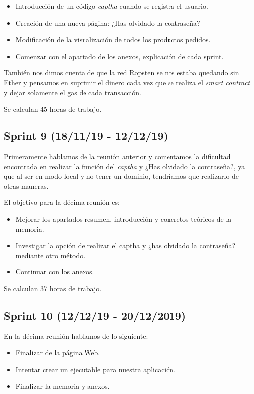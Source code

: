 \begin{itemize}
	\item Introducción de un código \textit{captha} cuando se registra el usuario.
	\item Creación de una nueva página: ¿Has olvidado la contraseña?
	\item Modificación de la visualización de todos los productos pedidos.
	\item Comenzar con el apartado de los anexos, explicación de cada sprint.
\end{itemize}

También nos dimos cuenta de que la red Ropsten se nos estaba quedando sin Ether y pensamos en suprimir el dinero cada vez que se realiza el \textit{smart contract} y dejar solamente el gas de cada transacción.

Se calculan 45 horas de trabajo.

\subsection{Sprint 9 (18/11/19 - 12/12/19)}

Primeramente hablamos de la reunión anterior y comentamos la dificultad encontrada en realizar la función del \textit{captha} y ¿Has olvidado la contraseña?, ya que al ser en modo local y no tener un dominio, tendríamos que realizarlo de otras maneras.

El objetivo para la décima reunión es:

\begin{itemize}
	\item Mejorar los apartados resumen, introducción y concretos teóricos de la memoria.
	\item Investigar la opción de realizar el captha y ¿has olvidado la contraseña? mediante otro método.
	\item Continuar con los anexos.
\end{itemize}

Se calculan 37 horas de trabajo.


\subsection{Sprint 10 (12/12/19 - 20/12/2019)}

En la décima reunión hablamos de lo siguiente:

\begin{itemize}
	\item Finalizar de la página Web.
	\item Intentar crear un ejecutable para nuestra aplicación.
	\item Finalizar la memoria y anexos.
\end{itemize}

